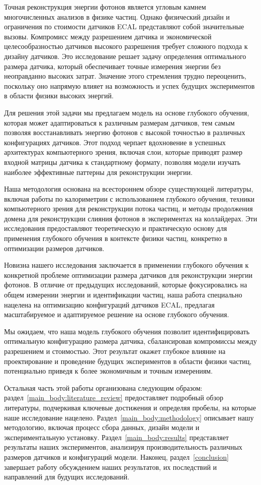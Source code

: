 \documentclass[a4paper,12pt]{extarticle}
\begin{document}
Точная реконструкция энергии фотонов является угловым камнем многочисленных анализов в физике частиц. Однако физический дизайн и ограничения по стоимости датчиков ECAL представляют собой значительные вызовы. Компромисс между разрешением датчика и экономической целесообразностью датчиков высокого разрешения требует сложного подхода к дизайну датчиков. Это исследование решает задачу определения оптимального размера датчика, который обеспечивает точные измерения энергии без неоправданно высоких затрат. Значение этого стремления трудно переоценить, поскольку оно напрямую влияет на возможность и успех будущих экспериментов в области физики высоких энергий.

Для решения этой задачи мы предлагаем модель на основе глубокого обучения, которая может адаптироваться к различным размерам датчиков, тем самым позволяя восстанавливать энергию фотонов с высокой точностью в различных конфигурациях датчиков. Этот подход черпает вдохновение в успешных архитектурах компьютерного зрения, включая слои, которые приводят размер входной матрицы датчика к стандартному формату, позволяя модели изучать наиболее эффективные паттерны для реконструкции энергии.

Наша методология основана на всестороннем обзоре существующей литературы, включая работы по калориметрии с использованием глубокого обучения, техники компьютерного зрения для реконструкции потока частиц, и методы продолжения домена для реконструкции слияния фотонов в экспериментах на коллайдерах. Эти исследования предоставляют теоретическую и практическую основу для применения глубокого обучения в контексте физики частиц, конкретно в оптимизации размеров датчиков.

Новизна нашего исследования заключается в применении глубокого обучения к конкретной проблеме оптимизации размера датчиков для реконструкции энергии фотонов. В отличие от предыдущих исследований, которые фокусировались на общем измерении энергии и идентификации частиц, наша работа специально нацелена на оптимизацию конфигураций датчиков ECAL, предлагая масштабируемое и адаптируемое решение на основе глубокого обучения.

Мы ожидаем, что наша модель глубокого обучения позволит идентифицировать оптимальную конфигурацию размера датчика, сбалансировав компромиссы между разрешением и стоимостью. Этот результат окажет глубокое влияние на проектирование и проведение будущих экспериментов в области физики частиц, потенциально приведя к более экономичным и точным измерениям.

Остальная часть этой работы организована следующим образом: раздел~\ref{main_body:literature_review} предоставляет подробный обзор литературы, подчеркивая ключевые достижения и определяя пробелы, на которые наше исследование нацелено. Раздел~\ref{main_body:methodology} описывает нашу методологию, включая процесс сбора данных, дизайн модели и экспериментальную установку. Раздел~\ref{main_body:results} представляет результаты наших экспериментов, анализируя производительность различных размеров датчиков и конфигураций модели. Наконец, раздел~\ref{conclusion} завершает работу обсуждением наших результатов, их последствий и направлений для будущих исследований.
\end{document}

